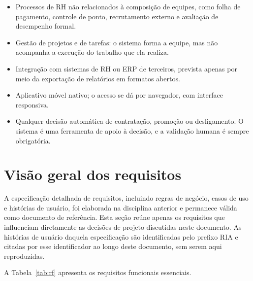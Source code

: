 \documentclass[a4paper,12pt,oneside,openany]{book}
\newif\iforientacoes
\newcommand{\orientacao}[1]{%
    \iforientacoes
        \begin{quote}
        \small\itshape\textbf{Orientação:} #1
        \end{quote}
    \fi
}
\begin{document}
\begin{itemize}[nosep]
    \item Processos de RH não relacionados à composição de equipes, como folha de
    pagamento, controle de ponto, recrutamento externo e avaliação de desempenho
    formal.
    \item Gestão de projetos e de tarefas: o sistema forma a equipe, mas não
    acompanha a execução do trabalho que ela realiza.
    \item Integração com sistemas de RH ou ERP de terceiros, prevista apenas por
    meio da exportação de relatórios em formatos abertos.
    \item Aplicativo móvel nativo; o acesso se dá por navegador, com interface
    responsiva.
    \item Qualquer decisão automática de contratação, promoção ou desligamento. O
    sistema é uma ferramenta de apoio à decisão, e a validação humana é sempre
    obrigatória.
\end{itemize}

\section{Visão geral dos requisitos}

\orientacao{Apresentem os requisitos funcionais e não funcionais mais
importantes para compreender o projeto. Caso a equipe tenha uma especificação
detalhada de requisitos produzida anteriormente, ela pode ser incluída em um
apêndice ou referenciada neste documento.}

A especificação detalhada de requisitos, incluindo regras de negócio, casos de
uso e histórias de usuário, foi elaborada na disciplina anterior e permanece
válida como documento de referência. Esta seção reúne apenas os requisitos que
influenciam diretamente as decisões de projeto discutidas neste documento. As
histórias de usuário daquela especificação são identificadas pelo prefixo RIA e
citadas por esse identificador ao longo deste documento, sem serem aqui
reproduzidas.

A Tabela~\ref{tab:rf} apresenta os requisitos funcionais essenciais.
\end{document}
